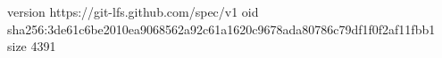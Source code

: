 version https://git-lfs.github.com/spec/v1
oid sha256:3de61c6be2010ea9068562a92c61a1620c9678ada80786c79df1f0f2af11fbb1
size 4391
